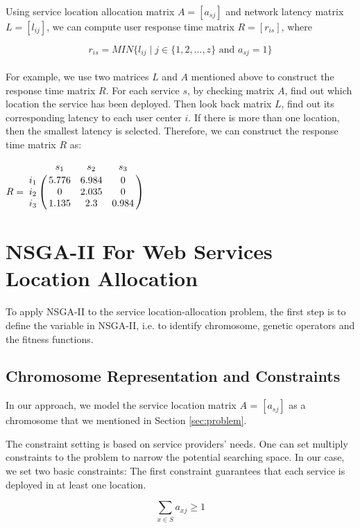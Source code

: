 \documentclass{llncs}
\let\bbordermatrix\bordermatrix
\begin{document}
Using service location allocation matrix $A = [a_{sj}]$ and network latency matrix $L = [l_{ij}]$, we can compute user
response time matrix $R = [r_{is}]$, where

{\centering
	\begin{equation}
		r_{is} = MIN\{l_{ij} \mid j \in \{1, 2, ..., z\} \text{ and } a_{sj} = 1\}
	\end{equation}
\\}
For example, we use two matrices $L$ and $A$ mentioned above to construct the response time matrix $R$. 
For each service $s$, by checking matrix $A$, find out which location the service has been deployed.
Then look back matrix $L$, find out its corresponding latency to each user center $i$. If there is
more than one location, then the smallest latency is selected. Therefore, we can construct the response time matrix $R$ as:

{\centering
$
R = \bbordermatrix{~ & s_{1} & s_{2} & s_{3}\cr
					i_{1}	&5.776 &6.984 &0	\cr
					i_{2}	&0  &2.035 &0	\cr
					i_{3}	&1.135 &2.3 &0.984	\cr}
$
\\}


\section{NSGA-II For Web Services Location Allocation}
\label{sec:algorithm_des}
To apply NSGA-II to the service location-allocation problem, the first step is to define the variable in NSGA-II, i.e. to
identify chromosome, genetic operators and the fitness functions.

\subsection{Chromosome Representation and Constraints}
In our approach, we model the service location matrix $A$ = $[a_{sj}]$ as a chromosome that we mentioned in Section 
\ref{sec:problem}.

The constraint setting is based on service providers' needs. One can set multiply constraints to the problem to narrow the potential searching space.
In our case, we set two basic constraints: The first constraint guarantees that each service is deployed in at 
least one location.

{\centering
	\begin{equation}
		\sum\limits_{x \in S} a_{xj} \geq 1
	\end{equation}
\\}
\end{document}
